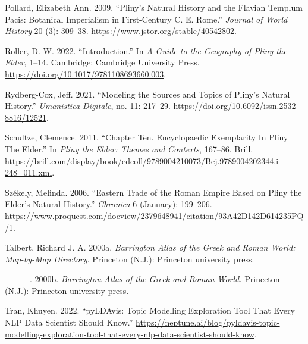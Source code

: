 \documentclass[
  12pt,
]{article}
\newlength{\cslhangindent}
\newlength{\cslentryspacingunit} %
\newenvironment{CSLReferences}[2] %
 {%
  \setlength{\parindent}{0pt}
  \ifodd #1
  \let\oldpar\par
  \def\par{\hangindent=\cslhangindent\oldpar}
  \fi
  \setlength{\parskip}{#2\cslentryspacingunit}
 }%
 {}
\begin{document}
\begin{CSLReferences}{1}{0}
\leavevmode{}%
Pollard, Elizabeth Ann. 2009. {``Pliny's {Natural} {History} and the
{Flavian} {Templum} {Pacis}: {Botanical} {Imperialism} in
{First}-{Century} {C}. {E}. {Rome}.''} \emph{Journal of World History}
20 (3): 309--38. \url{https://www.jstor.org/stable/40542802}.

\leavevmode{}%
Roller, D. W. 2022. {``Introduction.''} In \emph{A {Guide} to the
{Geography} of {Pliny} the {Elder}}, 1--14. Cambridge: Cambridge
University Press. \url{https://doi.org/10.1017/9781108693660.003}.

\leavevmode{}%
Rydberg-Cox, Jeff. 2021. {``Modeling the {Sources} and {Topics} of
{Pliny}'s {Natural} {History}.''} \emph{Umanistica Digitale}, no. 11:
217--29. \url{https://doi.org/10.6092/issn.2532-8816/12521}.

\leavevmode{}%
Schultze, Clemence. 2011. {``Chapter {Ten}. {Encyclopaedic}
{Exemplarity} {In} {Pliny} {The} {Elder}.''} In \emph{Pliny the {Elder}:
{Themes} and {Contexts}}, 167--86. Brill.
\url{https://brill.com/display/book/edcoll/9789004210073/Bej.9789004202344.i-248_011.xml}.

\leavevmode{}%
Székely, Melinda. 2006. {``Eastern {Trade} of the {Roman} {Empire} Based
on {Pliny} the {Elder}'s {Natural} {History}.''} \emph{Chronica} 6
(January): 199--206.
\url{https://www.proquest.com/docview/2379648941/citation/93A42D142D614235PQ/1}.

\leavevmode{}%
Talbert, Richard J. A. 2000a. \emph{Barrington Atlas of the {Greek} and
{Roman} World: Map-by-Map Directory}. Princeton (N.J.): Princeton
university press.

\leavevmode{}%
---------. 2000b. \emph{Barrington Atlas of the {Greek} and {Roman}
World.} Princeton (N.J.): Princeton university press.

\leavevmode{}%
Tran, Khuyen. 2022. {``pyLDAvis: Topic Modelling Exploration Tool That
Every NLP Data Scientist Should Know.''}
\url{https://neptune.ai/blog/pyldavis-topic-modelling-exploration-tool-that-every-nlp-data-scientist-should-know}.

\end{CSLReferences}
\end{document}
